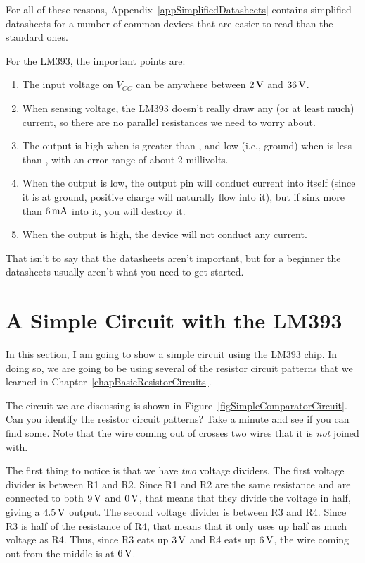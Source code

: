 For all of these reasons, Appendix~\ref{appSimplifiedDatasheets} contains simplified datasheets for a number of common devices that are easier to read than the standard ones. 

For the LM393, the important points are:

\begin{enumerate}
\item The input voltage on $V_{CC}$ can be anywhere between $2\,\si{\volt}$ and $36\,\si{\volt}$.
\item When sensing voltage, the LM393 doesn't really draw any (or at least much) current, so there are no parallel resistances we need to worry about.
\item The output is high when  is greater than , and low (i.e., ground) when  is less than , with an error range of about 2 millivolts.
\item When the output is low, the output pin will conduct current into itself (since it is at ground, positive charge will naturally flow into it), but if sink more than $6\,\si{\milli\ampere}$ into it, you will destroy it.
\item When the output is high, the device will not conduct any current.
\end{enumerate}

That isn't to say that the datasheets aren't important, but for a beginner the datasheets usually aren't what you need to get started.

\section{A Simple Circuit with the LM393}

In this section, I am going to show a simple circuit using the LM393 chip.
In doing so, we are going to be using several of the resistor circuit patterns that we learned in Chapter~\ref{chapBasicResistorCircuits}.


The circuit we are discussing is shown in Figure~\ref{figSimpleComparatorCircuit}.
Can you identify the resistor circuit patterns?  
Take a minute and see if you can find some.
Note that the wire coming out of  crosses two wires that it is \emph{not} joined with.

The first thing to notice is that we have \emph{two} voltage dividers.
The first voltage divider is between R1 and R2.
Since R1 and R2 are the same resistance and are connected to both $9\,\si{\volt}$ and $0\,\si{\volt}$, that means that they divide the voltage in half, giving a $4.5\,\si{\volt}$ output.
The second voltage divider is between R3 and R4.
Since R3 is half of the resistance of R4, that means that it only uses up half as much voltage as R4.  
Thus, since R3 eats up $3\,\si{\volt}$ and R4 eats up $6\,\si{\volt}$, the wire coming out from the middle is at $6\,\si{\volt}$.

